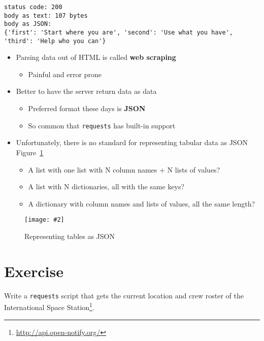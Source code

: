 \documentclass[krantzl]{krantz}
\newcommand{\figpdf}[4]{\begin{figure}%
\centering%
\texttt{[image: \#2]}%
\caption{#3}%
\label{#1}%
\end{figure}}
\newcommand{\figref}[1]{Figure~\ref{#1}}
\newcommand{\glossref}[1]{\textbf{#1}}
\newcommand{\hreffoot}[2]{{#1}\footnote{\href{#2}{#2}}}
\begin{document}
\begin{lstlisting}[frame=tblr,backgroundcolor=\color{black!5}]
status code: 200
body as text: 107 bytes
body as JSON:
{'first': 'Start where you are', 'second': 'Use what you have', 'third': 'Help who you can'}
\end{lstlisting}

\begin{itemize}
\item Parsing data out of HTML is called \glossref{web scraping}\begin{itemize}
\item Painful and error prone

\end{itemize}


\item Better to have the server return data as data\begin{itemize}
\item Preferred format these days is \glossref{JSON}

\item So common that \texttt{requests} has built-in support

\end{itemize}


\item Unfortunately, there is no standard for representing tabular data as JSON \figref{http_json_tables}\begin{itemize}
\item A list with one list with N column names + N lists of values?

\item A list with N dictionaries, all with the same keys?

\item A dictionary with column names and lists of values, all the same length?

\end{itemize}


\end{itemize}
\figpdf{http_json_tables}{http/./http_json_tables.pdf}{Representing tables as JSON}{0.8}
\section{Exercise}

Write a \texttt{requests} script that gets the current location and crew roster
of \hreffoot{the International Space Station}{http://api.open-notify.org/}.
\end{document}
